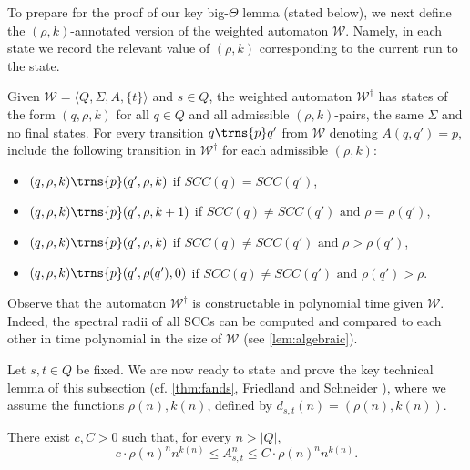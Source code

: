 \documentclass[10pt,a4paper]{amsart}
\numberwithin{equation}{section}
\theoremstyle{plain}
\theoremstyle{definition}
\theoremstyle{remark}
\newcommand\abra[1]{\langle #1 \rangle}
\newcommand\waannotated{\wa^\dagger}
\newcommand\dgf{d}
\newcommand{\SCC}{\ensuremath{\mathit{SCC}}}
\newcommand\wa{\mathcal{W}}
\begin{document}
To prepare for the proof of our key big-$\Theta$ lemma (stated below),
we next define the $(\rho,k)$-annotated version of the weighted automaton $\wa$.
Namely, in each state we record the relevant value of $(\rho, k)$ corresponding to the current run to the state.
\begin{defi}[The weighted automaton $\waannotated$] \label{defn:annotated} Given $\wa=\abra{Q,\Sigma,A,\{t\}}$ and $s \in Q$,
the weighted automaton $\waannotated$ has states of the form $(q,\rho, k)$ for all $q\in Q$ and all admissible $(\rho,k)$-pairs, the same $\Sigma$ and no final states.
For every transition $q\trns{p} q'$ from $\wa$ denoting $A(q,q') = p$, include the following transition in $\waannotated$ for
each admissible $(\rho,k)$:
\pagebreak
\begin{itemize}
\item $(q, \rho, k) \trns{p} (q', \rho, k)$ if $\SCC(q) {=}\SCC(q')$,
\item $(q, \rho, k) \trns{p} (q', \rho, k+1)$ if $\SCC(q){\ne}\SCC(q') \text{ and } \rho = \rho(q')$,
\item $(q, \rho, k) \trns{p} (q', \rho, k)$ if $\SCC(q){\ne}\SCC(q') \text{ and } \rho > \rho(q')$,
\item $(q, \rho, k) \trns{p} (q', \rho(q'), 0)$ if $\SCC(q){\ne}\SCC(q') \text{ and } \rho(q') > \rho$.
\end{itemize}

\end{defi}
Observe that the automaton $\waannotated$ is constructable in polynomial time given $\wa$. Indeed, the spectral radii of all SCCs can be computed and compared to each other in time polynomial in the size of $\wa$ (see \cref{lem:algebraic}).

Let $s,t\in Q$ be fixed. We are now ready to state and prove the key technical lemma of this subsection (cf. \cref{thm:fands}, Friedland and Schneider \cite{friedland1980growth,schneider1986influence}), where we assume the functions $\rho(n), k(n)$, defined by  $\dgf_{s,t}(n) = (\rho(n), k(n))$.
\begin{lem} \label{lemma:unarythetabound}
There exist $c,C > 0$ such that, for every $n > |Q|$,
\[
  c \cdot \rho(n)^n n^{k(n)} \le A^n_{s,t} \le C \cdot \rho(n)^n n^{k(n)}.
\]
\end{lem}
\end{document}
